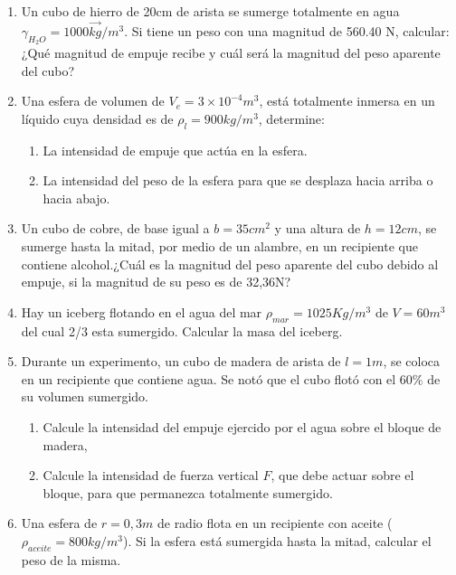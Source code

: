 \documentclass[../main]{subfiles}
\begin{document}
\begin{enumerate}
  \item Un cubo de hierro de 20cm de arista se sumerge totalmente en
    agua $\gamma_{H_2O}=1000\vec{kg}/m^3$. Si tiene un peso con una
    magnitud de 560.40 N, calcular: ¿Qué magnitud de empuje recibe y
    cuál será la magnitud del peso aparente del cubo?
  \item Una esfera de volumen de $V_e=3 \times 10^{-4}m^3$, está
    totalmente inmersa en un líquido cuya densidad es de $\rho_{l}=900
    kg/m^3$, determine:
    \begin{enumerate}
      \item La intensidad de empuje que actúa en la esfera.
      \item La intensidad del peso de la esfera para que se desplaza
        hacia arriba o hacia abajo.
    \end{enumerate}
  \item Un cubo de cobre, de base igual a $b=35cm^2$ y una altura de
    $h=12 cm$, se sumerge hasta la mitad, por medio de un alambre, en un
    recipiente que contiene alcohol.\@ ¿Cuál es la magnitud del peso
    aparente del cubo debido al empuje, si la magnitud de su peso
    es de 32,36N?\@
  \item Hay un iceberg flotando en el agua del mar $\rho_{mar}=1025
    Kg/m^3$ de $V=60m^3$ del cual 2/3 esta sumergido. Calcular la
    masa del iceberg.
  \item Durante un experimento, un cubo de madera de arista de $l=1m$,
    se coloca en un recipiente que contiene agua. Se notó que el cubo
    flotó con el 60\% de su volumen sumergido.
    \begin{enumerate}
      \item Calcule la intensidad del empuje ejercido por el agua sobre
        el bloque de madera,
      \item Calcule la intensidad de fuerza vertical $F$, que
        debe actuar sobre el
        bloque, para que permanezca totalmente sumergido.
    \end{enumerate}
  \item Una esfera de $r=0,3m$ de radio flota en un recipiente con
    aceite ($\rho_{aceite}=800kg/m^3$). Si la esfera está sumergida hasta
    la mitad, calcular el peso de la misma.

\end{enumerate}
\end{document}
